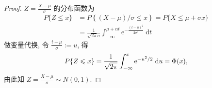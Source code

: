 \begin{proof}
    { $Z=\frac{X-\mu}{\sigma}$ 的分布函数为$$
            \begin{aligned}
                P\{Z \leqslant x\} & =P\left\{{(X-\mu)}/{\sigma} \leqslant x\right\}=P\{X \leqslant \mu+\sigma x\}                                         \\
                                   & =\frac{1}{\sqrt{2 \pi} \sigma} \int_{-\infty}^{\mu+\alpha t} \mathrm{e}^{-\frac{(t-\mu)^2}{2 \sigma^2}} \mathrm{~d} t
            \end{aligned}
        $$
        做变量代换, 令 $\frac{t-\mu}{\sigma}:=u$, 得$$
            \small P\{Z \leqslant x\}=\frac{1}{\sqrt{2 \pi}} \int_{-\infty}^x \mathrm{e}^{-u^2 / 2} \mathrm{~d} u=\Phi(x),
        $$
        由此知 $Z=\frac{X-\mu}{\sigma} \sim N(0,1)$.}
\end{proof}

